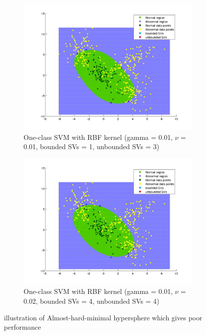 \documentclass[fleqn]{article}
\begin{document}
\begin{figure}[t!]
    \centering
    \begin{subfigure}[t]{0.5\textwidth}
        \includegraphics[scale=0.3, left]{./pics/task2_decisionregion_g=0.01_n=0.01.jpg}
        \caption{One-class SVM with RBF kernel (gamma = 0.01, $\nu$ = 0.01, bounded SVs = 1, unbounded SVs = 3)}
    \end{subfigure}
    \begin{subfigure}[t]{0.5\textwidth}
        \includegraphics[scale=0.3, left]{./pics/task2_decisionregion_g=0.01_n=0.02.jpg}
        \caption{One-class SVM with RBF kernel (gamma = 0.01, $\nu$ = 0.02, bounded SVs = 4, unbounded SVs = 4)}
    \end{subfigure}
    \caption{illustration of Almost-hard-minimal hypersphere which gives poor performance\label{fig:nearhardmin}}
\end{figure}
\end{document}
